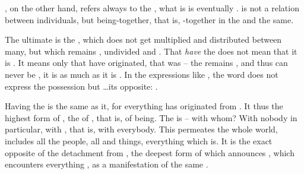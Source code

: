 , on the other hand, refers always to the , what is  is eventually  .
 is not a relation between individuals, but being-together, that is,
-together in the  and the same. 


\pa\label{pa:originShares} \inv The ultimate  is  the
, which does not get multiplied and distributed between many, but
which remains , undivided and .  That  {\em
  have} the  does not mean that it is . It means only that
 have originated, that  was  -- the  remains
, and thus can never be , it is  as much as it is
. In the expressions like , the word
 does not express the possession but \ldots its opposite:
.

Having the  is the same as  it, for everything has
originated from . It thus  the highest form of
, the  of , that is, of being.
The  is  -- with whom?  With nobody in particular, with
, that is, with everybody.  This  permeates the whole
world, includes all the people, all  and  things,
everything which is.  It is the exact opposite of the {detachment} from , the deepest form of  which announces ,
which encounters everything , as a manifestation of
the same .

